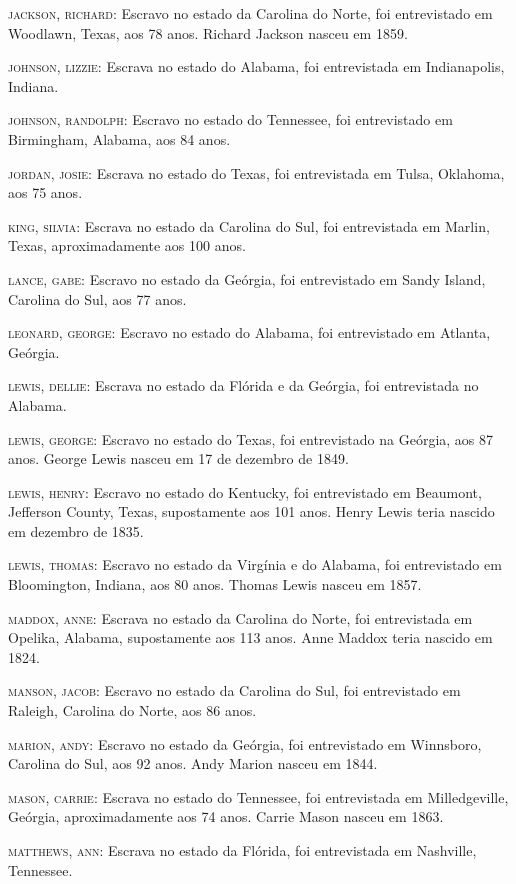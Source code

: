 \begin{Parskip}
\textsc{jackson, richard:} Escravo no estado da Carolina do Norte, foi
entrevistado em Woodlawn, Texas, aos 78 anos. Richard Jackson nasceu em
1859.

\textsc{johnson, lizzie:} Escrava no estado do Alabama, foi entrevistada
em Indianapolis, Indiana.

\textsc{johnson, randolph:} Escravo no estado do Tennessee, foi
entrevistado em Birmingham, Alabama, aos 84 anos.

\textsc{jordan, josie:} Escrava no estado do Texas, foi entrevistada em
Tulsa, Oklahoma, aos 75 anos.

\textsc{king, silvia:} Escrava no estado da Carolina do Sul, foi
entrevistada em Marlin, Texas, aproximadamente aos 100 anos.

\textsc{lance, gabe:} Escravo no estado da Geórgia, foi entrevistado em
Sandy Island, Carolina do Sul, aos 77 anos.

\textsc{leonard, george:} Escravo no estado do Alabama, foi entrevistado
em Atlanta, Geórgia.

\textsc{lewis, dellie:} Escrava no estado da Flórida e da Geórgia, foi
entrevistada no Alabama.

\textsc{lewis, george:} Escravo no estado do Texas, foi entrevistado na
Geórgia, aos 87 anos. George Lewis nasceu em 17 de dezembro de 1849.

\textsc{lewis, henry:} Escravo no estado do Kentucky, foi entrevistado
em Beaumont, Jefferson County, Texas, supostamente aos 101 anos. Henry
Lewis teria nascido em dezembro de 1835.

\textsc{lewis, thomas:} Escravo no estado da Virgínia e do Alabama, foi
entrevistado em Bloomington, Indiana, aos 80 anos. Thomas Lewis nasceu
em 1857.

\textsc{maddox, anne:} Escrava no estado da Carolina do Norte, foi
entrevistada em Opelika, Alabama, supostamente aos 113 anos. Anne Maddox
teria nascido em 1824.

\textsc{manson, jacob:} Escravo no estado da Carolina do Sul, foi
entrevistado em Raleigh, Carolina do Norte, aos 86 anos.

\textsc{marion, andy:} Escravo no estado da Geórgia, foi entrevistado em
Winnsboro, Carolina do Sul, aos 92 anos. Andy Marion nasceu em 1844.

\textsc{mason, carrie:} Escrava no estado do Tennessee, foi entrevistada
em Milledgeville, Geórgia, aproximadamente aos 74 anos. Carrie Mason
nasceu em 1863.

\textsc{matthews, ann:} Escrava no estado da Flórida, foi entrevistada
em Nashville, Tennessee.


\end{Parskip}
